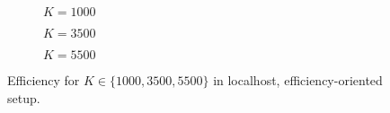 \begin{figure}[!hp]
\centering
\begin{subfigure}{0.23\textwidth}
	\captionsetup{justification=centering,font=scriptsize}
	\centering
	\setlength\fwidth{\textwidth}
	\setlength{}
	
	\caption{$K=1000$}
	\label{fig:lh_eff_1000_eff}
\end{subfigure}\hspace{2em}%
\begin{subfigure}{0.23\textwidth}
	\captionsetup{justification=centering,font=scriptsize}
	\centering
	\setlength\fwidth{\textwidth}
	\setlength{}
	
	\caption{$K=3500$}
	\label{fig:lh_eff_3500_eff}
\end{subfigure}\hspace{2em}%
\begin{subfigure}{0.23\textwidth}
	\captionsetup{justification=centering,font=scriptsize}
	\centering
	\setlength\fwidth{\textwidth}
	\setlength{}
	
	\caption{$K=5500$}
	\label{fig:lh_eff_5500_eff}
\end{subfigure}
\caption{Efficiency for $K \in \{1000, 3500, 5500\}$ in localhost, efficiency-oriented setup.}
\label{fig:eff_nonaggr}
\end{figure}


